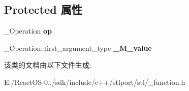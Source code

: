 \subsection*{Protected 属性}
\begin{DoxyCompactItemize}
\item 
\mbox{\label{classbinder1st_a590dc7afe164285bb385a9aeb4b1df49}} 
\+\_\+\+Operation {\bfseries op}
\item 
\mbox{\label{classbinder1st_ac9caac2c7fe36df0d35b6377789754d6}} 
\+\_\+\+Operation\+::first\+\_\+argument\+\_\+type {\bfseries \+\_\+\+M\+\_\+value}
\end{DoxyCompactItemize}


该类的文档由以下文件生成\+:\begin{DoxyCompactItemize}
\item 
E\+:/\+React\+O\+S-\/0../sdk/include/c++/stlport/stl/\+\_\+function.\+h\end{DoxyCompactItemize}
